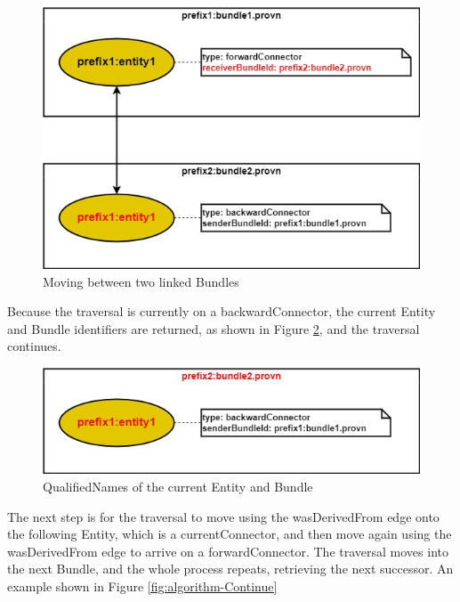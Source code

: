 \documentclass[
  digital,     %
  oneside,     %
  nosansbold,  %
  nocolorbold, %
  lof,         %
  lot,         %
]{fithesis4}
\begin{document}
\begin{figure}[htbp]
  \begin{center}
    \includegraphics[width=12cm]{fithesis/images/algorithm-BundleLink.png}
  \end{center}
  \caption{Moving between two linked Bundles}
  \label{fig:algorithm-BundleLink}
\end{figure}

Because the traversal is currently on a backwardConnector, the current Entity and Bundle identifiers are returned, as shown in Figure \ref{fig:algorithm-Result}, and the traversal continues.

\begin{figure}[htbp]
  \begin{center}
    \includegraphics[width=12cm]{fithesis/images/algorithm-Result.png}
  \end{center}
  \caption{QualifiedNames of the current Entity and Bundle}
  \label{fig:algorithm-Result}
\end{figure}

The next step is for the traversal to move using the wasDerivedFrom edge onto the following Entity, which is a currentConnector, and then move again using the wasDerivedFrom edge to arrive on a forwardConnector. The traversal moves into the next Bundle, and the whole process repeats, retrieving the next successor. An example shown in Figure \ref{fig:algorithm-Continue}
\end{document}

